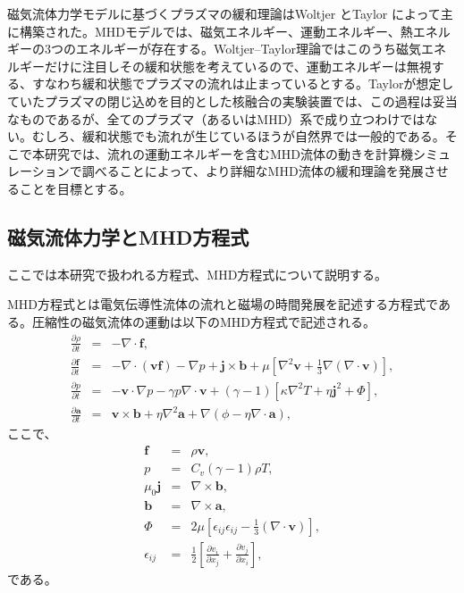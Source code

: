 \documentclass[12pt]{jsarticle}
\begin{document}
磁気流体力学モデルに基づくプラズマの緩和理論はWoltjer \cite{woltjer1958theorem}とTaylor \cite{taylor1974relaxation}によって主に構築された。MHDモデルでは、磁気エネルギー、運動エネルギー、熱エネルギーの3つのエネルギーが存在する。Woltjer--Taylor理論ではこのうち磁気エネルギーだけに注目しその緩和状態を考えているので、運動エネルギーは無視する、すなわち緩和状態でプラズマの流れは止まっているとする。Taylorが想定していたプラズマの閉じ込めを目的とした核融合の実験装置では、この過程は妥当なものであるが、全てのプラズマ（あるいはMHD）系で成り立つわけではない。むしろ、緩和状態でも流れが生じているほうが自然界では一般的である。そこで本研究では、流れの運動エネルギーを含むMHD流体の動きを計算機シミュレーションで調べることによって、より詳細なMHD流体の緩和理論を発展させることを目標とする。


\subsection{磁気流体力学とMHD方程式}
ここでは本研究で扱われる方程式、MHD方程式について説明する。

MHD方程式とは電気伝導性流体の流れと磁場の時間発展を記述する方程式である。圧縮性の磁気流体の運動は以下のMHD方程式で記述される\cite{宇宙流体力学}。
\begin{eqnarray}
\frac{\partial \rho}{\partial t}&=&-\nabla \cdot \bm{f} , \\
\frac{\partial \bm{f}}{\partial t}&=&-\nabla \cdot (\bm{v}\bm{f})-\nabla p+\bm{j}\times\bm{b}+\mu\left[\nabla^2\bm{v}+\frac{1}{3}\nabla(\nabla\cdot\bm{v})\right], \\
\frac{\partial p}{\partial t}&=&-\bm{v}\cdot\nabla p - \gamma p \nabla\cdot \bm{v} + (\gamma-1)\left[\kappa\nabla^2 T +\eta\bm{j}^2 + \Phi\right], \\
\frac{\partial \bm{a}}{\partial t}&=&\bm{v}\times\bm{b}+\eta\nabla^2\bm{a} +\nabla(\phi-\eta\nabla\cdot\bm{a}), 
\end{eqnarray}
ここで、
\begin{eqnarray}
\bm{f}&=&\rho\bm{v},\\
p&=&C_v(\gamma-1)\rho T,\\
\mu_0\bm{j}&=&\nabla\times\bm{b},\\ \label{function1}
\bm{b}&=&\nabla\times\bm{a},\\
\Phi&=&2\mu\left[\epsilon_{ij}\epsilon_{ij}-\frac{1}{3}(\nabla\cdot\bm{v})\right],\\
\epsilon_{ij}&=&\frac{1}{2}\left[\frac{\partial v_i}{\partial x_j} + \frac{\partial v_j}{\partial x_i}\right],
\end{eqnarray}
である。
\end{document}
